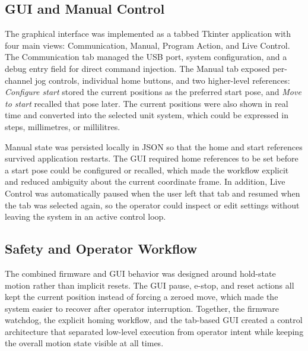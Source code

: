 \subsection{GUI and Manual Control}
The graphical interface was implemented as a tabbed Tkinter application with four main views: Communication, Manual, Program Action, and Live Control. The Communication tab managed the USB port, system configuration, and a debug entry field for direct command injection. The Manual tab exposed per-channel jog controls, individual home buttons, and two higher-level references: \emph{Configure start} stored the current positions as the preferred start pose, and \emph{Move to start} recalled that pose later. The current positions were also shown in real time and converted into the selected unit system, which could be expressed in steps, millimetres, or millilitres.

Manual state was persisted locally in JSON so that the home and start references survived application restarts. The GUI required home references to be set before a start pose could be configured or recalled, which made the workflow explicit and reduced ambiguity about the current coordinate frame. In addition, Live Control was automatically paused when the user left that tab and resumed when the tab was selected again, so the operator could inspect or edit settings without leaving the system in an active control loop.

\subsection{Safety and Operator Workflow}
The combined firmware and GUI behavior was designed around hold-state motion rather than implicit resets. The GUI pause, e-stop, and reset actions all kept the current position instead of forcing a zeroed move, which made the system easier to recover after operator interruption. Together, the firmware watchdog, the explicit homing workflow, and the tab-based GUI created a control architecture that separated low-level execution from operator intent while keeping the overall motion state visible at all times.
